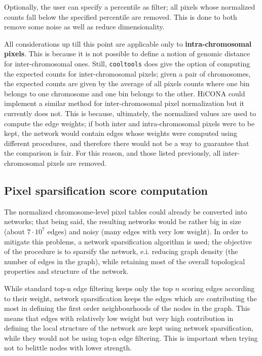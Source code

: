 Optionally, the user can specify a percentile as filter; all pixels whose normalized counts fall below the specified percentile are removed. This is done to both remove some noise as well as reduce dimensionality. 
 
All considerations up till this point are applicable only to \textbf{intra-chromosomal pixels}. This is because it is not possible to define a notion of genomic distance for inter-chromosomal ones. Still, \texttt{cooltools} does give the option of computing the expected counts for inter-chromosomal pixels; given a pair of chromosomes, the expected counts are given by the average of all pixels counts where one bin belongs to one chromosome and one bin belongs to the other. HiCONA could implement a similar method for inter-chromosomal pixel normalization but it currently does not. This is because, ultimately, the normalized values are used to compute the edge weights; if both inter and intra-chromosomal pixels were to be kept, the network would contain edges whose weights were computed using different procedures, and therefore there would not be a way to guarantee that the comparison is fair. For this reason, and those listed previously, all inter-chromosomal pixels are removed.

\subsection{Pixel sparsification score computation}

The normalized chromosome-level pixel tables could already be converted into networks; that being said, the resulting networks would be rather big in size (about $7 \cdot 10^7$ edges) and noisy (many edges with very low weight). In order to mitigate this problems, a network sparsification algorithm\cite{sparsification2009} is used; the objective of the procedure is to sparsify the network, e.i. reducing graph density (the number of edges in the graph), while retaining most of the overall topological properties and structure of the network.

While standard top-n edge filtering keeps only the top $n$ scoring edges according to their weight, network sparsification keeps the edges which are contributing the most in defining the first order neighbourhoods of the nodes in the graph. This means that edges with relatively low weight but very high contribution in defining the local structure of the network are kept using network sparsification, while they would not be using top-n edge filtering. This is important when trying not to belittle nodes with lower strength.

